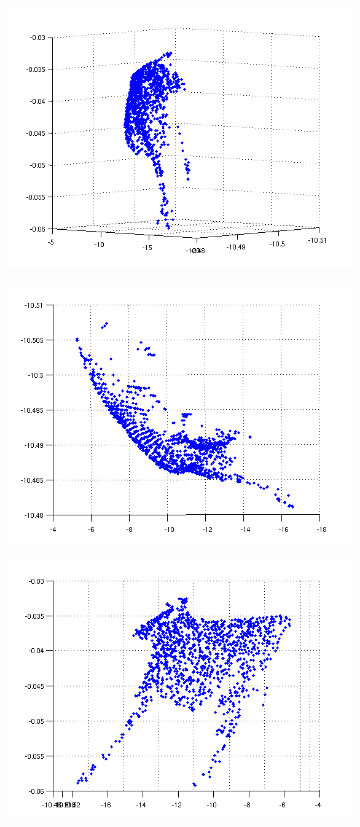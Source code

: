 \documentclass{paper}
\begin{document}
\begin{figure}
\centering
\begin{subfigure}{0.3\textwidth}
   \includegraphics[width=\textwidth]{cow_depths}
\end{subfigure}
\begin{subfigure}{0.3\textwidth}
   \includegraphics[width=\textwidth]{cow_depths_above}
\end{subfigure}
\begin{subfigure}{0.3\textwidth}
   \includegraphics[width=\textwidth]{cow_depths_side}

\end{subfigure}
\end{figure}
\end{document}
